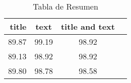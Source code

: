 \begin{table}
\centering
\caption{Tabla de Resumen}
\label{tab:resumen}
\begin{tabular}{rccc}
\toprule
 title &   text &  title and text \\
\midrule
 89.87 &  99.19 &           98.92 \\
 89.13 &  98.92 &           98.92 \\
 89.80 &  98.78 &           98.58 \\
\bottomrule
\end{tabular}
\end{table}
